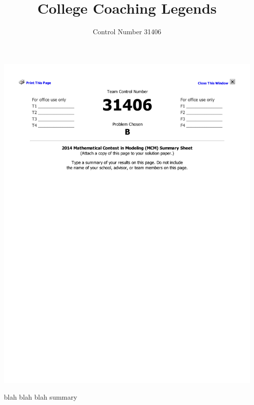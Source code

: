 \documentclass[11pt,notitlepage]{article}
\begin{document}
\fancyhf{}
\includegraphics[trim= 100 500 100 100]{summary_sheet.pdf}


blah blah blah summary

\pagestyle{fancyplain}
\fancyhf{}
\setlength{\headsep}{0.2in} 

\title{College Coaching Legends}
\author{Control Number 31406}
\maketitle
\end{document}
